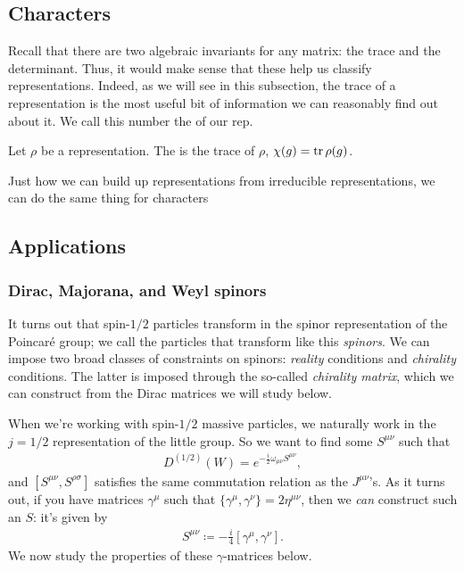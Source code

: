\documentclass[11pt]{article}
\begin{document}
\subsection{Characters}

Recall that there are two algebraic invariants for any matrix:
the trace and the determinant. Thus, it would make sense that
these help us classify representations. Indeed, as we will see
in this subsection, the trace of a representation is the most useful
bit of information we can reasonably find out about it. We call this
number the  of our rep.

\begin{definition}
    Let $\rho$ be a representation. The  is the trace of
    $\rho$, $\chi(g) = \operatorname{tr}{\rho(g)}$.
\end{definition}

Just how we can build up representations from irreducible representations,
we can do the same thing for characters


\subsection{Applications}

\subsubsection{Dirac, Majorana, and Weyl spinors}

\begin{reemark}
    It turns out that spin-$1/2$ particles transform in the spinor
    representation of the Poincaré group; we call the particles
    that transform like this \emph{spinors}. We can impose two
    broad classes of constraints on spinors: \emph{reality} conditions
    and \emph{chirality} conditions. The latter is imposed through the
    so-called \emph{chirality matrix}, which we can construct from
    the Dirac matrices we will study below.
\end{reemark}

\begin{eexample}
    When we're working with spin-$1/2$ massive particles, we naturally work
    in the $j = 1/2$ representation of the little group. So we want to find
    some $S^{\mu \nu}$ such that
    \begin{align*}
        D^{(1/2)}(W) = e^{- \frac{i}{2} \omega_{\mu \nu} S^{\mu \nu}},
    \end{align*} 
    and $[S^{\mu \nu}, S^{\rho \sigma}]$ satisfies the same commutation relation
    as the $J^{\mu \nu}$'s. As it turns out, if you have matrices $\gamma^\mu$
    such that $\{ \gamma^\mu, \gamma^\nu \} = 2 \eta^{\mu \nu}$, then we
    \emph{can} construct such an $S$: it's given by
    \begin{align*}
        \boxed{S^{\mu \nu} \coloneqq - \frac{i}{4} [\gamma^\mu, \gamma^\nu].}
    \end{align*}
    We now study the properties of these $\gamma$-matrices below.
\end{eexample}
\end{document}

